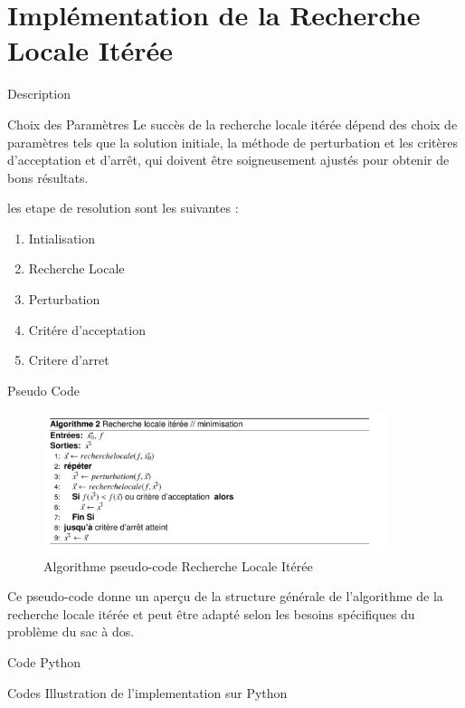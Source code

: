 \documentclass[11pt]{beamer}
\begin{document}
\section{Implémentation de la Recherche Locale Itérée}
\begin{frame}{Description}
    \begin{block}{Choix des Paramètres}
    Le succès de la recherche locale itérée dépend des choix de paramètres tels que la solution initiale, la méthode de perturbation et les critères d’acceptation et d’arrêt, qui doivent être soigneusement ajustés pour obtenir de bons résultats.
\end{block}
les etape de resolution sont les suivantes :
\begin{enumerate}
	\item Intialisation
	\item Recherche Locale
	\item Perturbation
	\item Critére d'acceptation
	\item Critere d'arret
\end{enumerate}
\end{frame}
\begin{frame}{Pseudo Code}
   \begin{figure}[h]
    \centering
    \includegraphics[width=0.9\textwidth]{algo.png}
    \caption{Algorithme pseudo-code Recherche Locale Itérée}
    \label{fig:mon_image}
\end{figure}
Ce pseudo-code donne un aperçu de la structure générale de l’algorithme de la recherche locale itérée et peut être adapté selon les besoins spécifiques du problème du sac à dos.
\end{frame}

\begin{frame}{Code Python}
	 \begin{block}{Codes}
   		Illustration de l'implementation sur Python
\end{block}
\end{frame}
\end{document}
